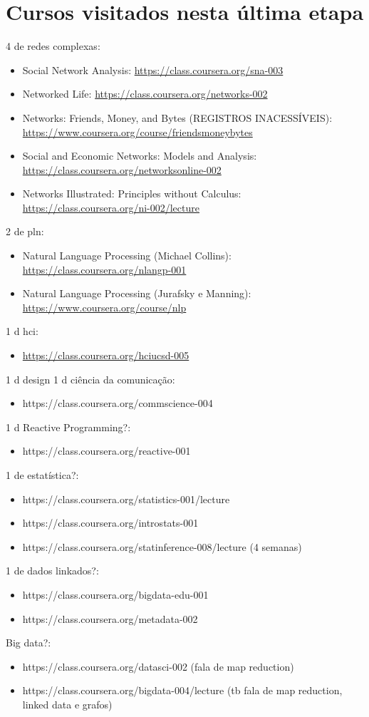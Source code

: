 \documentclass[12pt]{report}
\begin{document}
\part{Cursos visitados nesta última etapa}
4 de redes complexas:
\begin{itemize}
    \item Social Network Analysis: \url{https://class.coursera.org/sna-003}
    \item Networked Life: \url{https://class.coursera.org/networks-002}
    \item Networks: Friends, Money, and Bytes (REGISTROS INACESSÍVEIS): \url{https://www.coursera.org/course/friendsmoneybytes}
    \item Social and Economic Networks: Models and Analysis: \url{https://class.coursera.org/networksonline-002}
    \item Networks Illustrated: Principles without Calculus: \url{https://class.coursera.org/ni-002/lecture}
\end{itemize}
2 de pln:
\begin{itemize}
    \item Natural Language Processing (Michael Collins): \url{https://class.coursera.org/nlangp-001}
    \item Natural Language Processing (Jurafsky e Manning): \url{https://www.coursera.org/course/nlp}
\end{itemize}
1 d hci:
\begin{itemize}
    \item \url{https://class.coursera.org/hciucsd-005}
\end{itemize}
1 d design
1 d ciência da comunicação:
\begin{itemize}
    \item https://class.coursera.org/commscience-004
\end{itemize}
1 d Reactive Programming?:
\begin{itemize}
    \item https://class.coursera.org/reactive-001
\end{itemize}
1 de estatística?:
\begin{itemize}
    \item https://class.coursera.org/statistics-001/lecture
    \item https://class.coursera.org/introstats-001
    \item https://class.coursera.org/statinference-008/lecture (4 semanas)
\end{itemize}
1 de dados linkados?:
\begin{itemize}
    \item https://class.coursera.org/bigdata-edu-001
    \item https://class.coursera.org/metadata-002
\end{itemize}
Big data?:
\begin{itemize}
    \item https://class.coursera.org/datasci-002 (fala de map reduction)
    \item https://class.coursera.org/bigdata-004/lecture (tb fala de map reduction, linked data e grafos)
\end{itemize}
\end{document}
